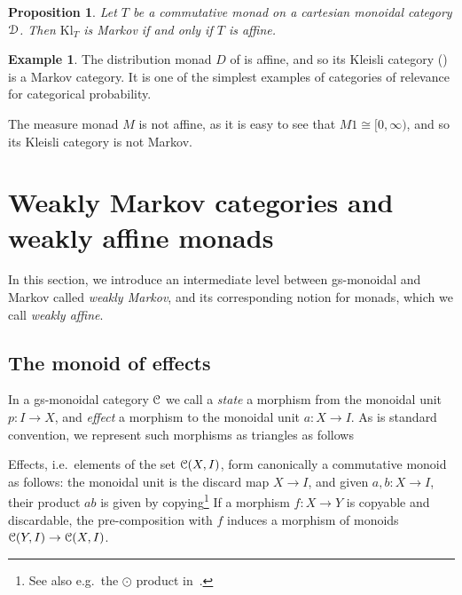 \documentclass[a4paper,UKenglish,numberwithinsect,cleveref, autoref, thm-restate]{lipics-v2021}
\theoremstyle{plain} %
\newtheorem{myproposition}[mytheorem]{Proposition}
\theoremstyle{definition} %
\newtheorem{myexample}[mytheorem]{Example}
\begin{document}
\begin{myproposition}\label{affinemarkov}
Let $T$ be a commutative monad on a cartesian monoidal category $\mathcal{D}$. Then $\mathrm{Kl}_T$ is Markov if and only if $T$ is affine.
\end{myproposition}
 
 
\begin{myexample}
 The distribution monad $D$ of  is affine, and so its Kleisli category () is a Markov category. It is one of the simplest examples of categories of relevance for categorical probability.
 
The measure monad $M$ is not affine, as it is easy to see that $M1\cong[0,\infty)$, and so its Kleisli category is not Markov.
\end{myexample}


\section{Weakly Markov categories and weakly affine monads}
\label{secweakly}

In this section, we introduce an intermediate level between gs-monoidal and Markov called \emph{weakly Markov}, and its corresponding notion for monads, which we call \emph{weakly affine}.

\subsection{The monoid of effects}\label{monoids}

In a gs-monoidal category $\mathcal{C}$ we call a \emph{state} a morphism from the monoidal unit $p:I\to X$, and \emph{effect} a morphism to the monoidal unit $a:X\to I$.
As is standard convention, we represent such morphisms as triangles as follows

 Effects, i.e.~elements of the set $\mathcal{C}(X,I)$, form canonically a commutative monoid as follows: the monoidal unit is the discard map $X\to I$, and given $a,b:X\to I$, their product $ab$ is given by copying\footnote{See also e.g.~the $\odot$ product in~\cite[Proposition~3.10]{coecke2011phasegroups}.}
If a morphism $f:X\to Y$ is copyable and discardable, the pre-composition with $f$ induces a morphism of monoids $\mathcal{C}(Y,I)\to\mathcal{C}(X,I)$. 
\end{document}

